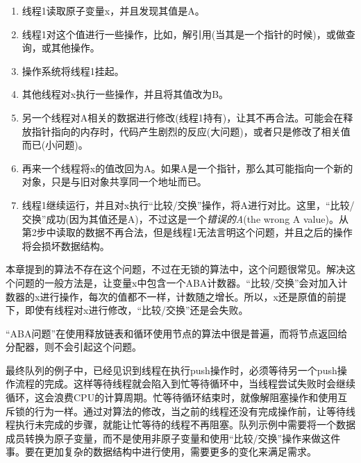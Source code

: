 \begin{enumerate}
    \item 线程1读取原子变量x，并且发现其值是A。
    \item 线程1对这个值进行一些操作，比如，解引用(当其是一个指针的时候)，或做查询，或其他操作。
    \item 操作系统将线程1挂起。
    \item 其他线程对x执行一些操作，并且将其值改为B。
    \item 另一个线程对A相关的数据进行修改(线程1持有)，让其不再合法。可能会在释放指针指向的内存时，代码产生剧烈的反应(大问题)，或者只是修改了相关值而已(小问题)。
    \item 再来一个线程将x的值改回为A。如果A是一个指针，那么其可能指向一个新的对象，只是与旧对象共享同一个地址而已。
    \item 线程1继续运行，并且对x执行“比较/交换”操作，将A进行对比。这里，“比较/交换”成功(因为其值还是A)，不过这是一个\textit{错误的A}(the wrong A value)。从第2步中读取的数据不再合法，但是线程1无法言明这个问题，并且之后的操作将会损坏数据结构。
\end{enumerate}

本章提到的算法不存在这个问题，不过在无锁的算法中，这个问题很常见。解决这个问题的一般方法是，让变量x中包含一个ABA计数器。“比较/交换”会对加入计数器的x进行操作，每次的值都不一样，计数随之增长。所以，x还是原值的前提下，即使有线程对x进行修改，“比较/交换”还是会失败。

“ABA问题”在使用释放链表和循环使用节点的算法中很是普遍，而将节点返回给分配器，则不会引起这个问题。


最终队列的例子中，已经见识到线程在执行push操作时，必须等待另一个push操作流程的完成。这样等待线程就会陷入到忙等待循环中，当线程尝试失败时会继续循环，这会浪费CPU的计算周期。忙等待循环结束时，就像解阻塞操作和使用互斥锁的行为一样。通过对算法的修改，当之前的线程还没有完成操作前，让等待线程执行未完成的步骤，就能让忙等待的线程不再阻塞。队列示例中需要将一个数据成员转换为原子变量，而不是使用非原子变量和使用“比较/交换”操作来做这件事。要在更加复杂的数据结构中进行使用，需要更多的变化来满足需求。